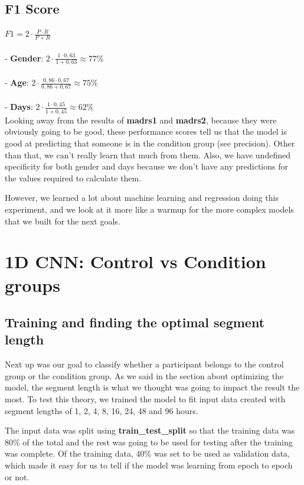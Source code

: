 \subsection{F1 Score}
$ F1 = 2 \cdot \frac{P \cdot R}{P + R} $
\\\\
- \textbf{Gender}: $2 \cdot \frac{1 \cdot 0,63}{1 + 0,63} \approx 77\%$\\\\
- \textbf{Age}: $2 \cdot \frac{0,86 \cdot 0,67}{0,86 + 0,67} \approx 75\%$\\\\
- \textbf{Days}: $2 \cdot \frac{1 \cdot 0,45}{1 + 0,45} \approx 62\%$\\

Looking away from the results of \textbf{madrs1} and \textbf{madrs2}, because they were obviously going to be good, these performance scores tell us that the model 
is good at predicting that someone is in the condition group (see precision). Other than that, we can't really learn that much from them. 
Also, we have undefined specificity for both gender and days because we don't have any predictions for the values required to calculate them. 

However, we learned a lot about machine learning and regression doing this experiment, and we look at it more like a warmup for the more complex models that we built 
for the next goals.

\section{1D CNN: Control vs Condition groups}

\subsection{Training and finding the optimal segment length}

Next up was our goal to classify whether a participant belongs to the control group or the condition group. 
As we said in the section about optimizing the model, the segment length is what we thought was going to impact the result the most.  
To test this theory, we trained the model to fit input data created with segment lengths of 1, 2, 4, 8, 16, 24, 48 and 96 hours. 

The input data was split using \textbf{train\_test\_split} so that the training data was 80\% of the total and the rest was going to be used for 
testing after the training was complete. Of the training data, 40\% was set to be used as validation data, which made it easy for us to tell if the model was 
learning from epoch to epoch or not. 

